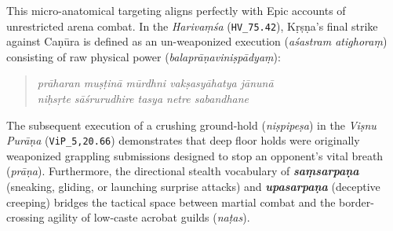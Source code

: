 \documentclass[11pt,letterpaper]{article}
\begin{document}
This micro-anatomical targeting aligns perfectly with Epic accounts of unrestricted arena combat. In the \textit{Harivaṃśa} (\texttt{HV\_75.42}), Kṛṣṇa’s final strike against Caṇūra is defined as an un-weaponized execution (\textit{aśastram atighoraṃ}) consisting of raw physical power (\textit{balaprāṇaviniṣpādyaṃ}):
\begin{quotation}
\noindent \textit{prāharan muṣṭinā mūrdhni vakṣasyāhatya jānunā} \\
\noindent \textit{niḥsṛte sāśrurudhire tasya netre sabandhane}
\end{quotation}

The subsequent execution of a crushing ground-hold (\textit{niṣpipeṣa}) in the \textit{Viṣnu Purāṇa} (\texttt{ViP\_5,20.66}) demonstrates that deep floor holds were originally weaponized grappling submissions designed to stop an opponent's vital breath (\textit{prāṇa}). Furthermore, the directional stealth vocabulary of \textbf{\textit{saṃsarpaṇa}} (sneaking, gliding, or launching surprise attacks) and \textbf{\textit{upasarpaṇa}} (deceptive creeping) bridges the tactical space between martial combat and the border-crossing agility of low-caste acrobat guilds (\textit{naṭas}).
\end{document}

